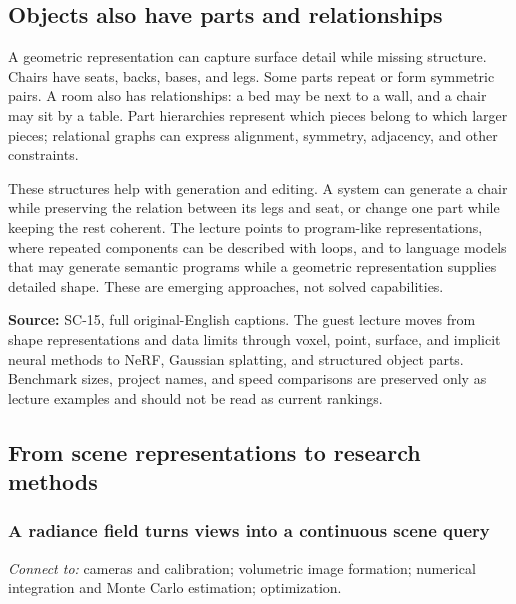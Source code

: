 \subsection{Objects also have parts and relationships}\label{04-visual-computing-ii-ch034-objects-also-have-parts-and-relationships}

A geometric representation can capture surface detail while missing structure. Chairs have seats, backs, bases, and legs. Some parts repeat or form symmetric pairs. A room also has relationships: a bed may be next to a wall, and a chair may sit by a table. Part hierarchies represent which pieces belong to which larger pieces; relational graphs can express alignment, symmetry, adjacency, and other constraints.

These structures help with generation and editing. A system can generate a chair while preserving the relation between its legs and seat, or change one part while keeping the rest coherent. The lecture points to program-like representations, where repeated components can be described with loops, and to language models that may generate semantic programs while a geometric representation supplies detailed shape. These are emerging approaches, not solved capabilities.

\textbf{Source:} SC-15, full original-English captions. The guest lecture moves from shape representations and data limits through voxel, point, surface, and implicit neural methods to NeRF, Gaussian splatting, and structured object parts. Benchmark sizes, project names, and speed comparisons are preserved only as lecture examples and should not be read as current rankings.

\subsection{From scene representations to research methods}\label{04-visual-computing-ii-ch034-from-scene-representations-to-research-methods}

\subsubsection{A radiance field turns views into a continuous scene query}\label{04-visual-computing-ii-ch034-a-radiance-field-turns-views-into-a-continuous-scene-query}

\emph{Connect to:} cameras and calibration; volumetric image formation; numerical integration and Monte Carlo estimation; optimization.

